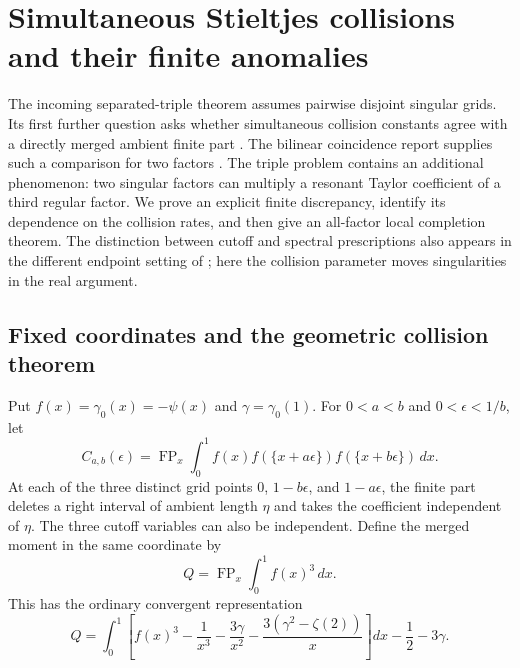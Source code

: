 \section{Simultaneous Stieltjes collisions and their finite anomalies}
\label{cl:sec}

The incoming separated-triple theorem assumes pairwise disjoint singular
grids. Its first further question asks whether simultaneous collision
constants agree with a directly merged ambient finite part
\cite[Question~1]{RepoExact}. The bilinear coincidence report supplies
such a comparison for two factors \cite{RepoCoincident}. The triple
problem contains an additional phenomenon: two singular factors can
multiply a resonant Taylor coefficient of a third regular factor.
We prove an explicit finite discrepancy, identify its dependence on the
collision rates, and then give an all-factor local completion theorem.
The distinction between cutoff and spectral prescriptions also appears
in the different endpoint setting of \cite{RepoEndpoint}; here the
collision parameter moves singularities in the real argument.

\subsection{Fixed coordinates and the geometric collision theorem}
\label{cl:geometric}

Put $f(x)=\gamma_0(x)=-\psi(x)$ and $\gamma=\gamma_0(1)$. For
$0<a<b$ and $0<\epsilon<1/b$, let
\[
 C_{a,b}(\epsilon)=\operatorname{FP}_x\int_0^1
 f(x)f(\{x+a\epsilon\})f(\{x+b\epsilon\})\,dx.
\]
At each of the three distinct grid points $0$, $1-b\epsilon$, and
$1-a\epsilon$, the finite part deletes a right interval of ambient
length $\eta$ and takes the coefficient independent of $\eta$.
The three cutoff variables can also be independent. Define the merged
moment in the same coordinate by
\begin{equation}\label{cl:merged}
 Q=\operatorname{FP}_x\int_0^1f(x)^3\,dx.
\end{equation}
This has the ordinary convergent representation
\begin{equation}\label{cl:merged-convergent}
 Q=\int_0^1\left[f(x)^3-\frac1{x^3}-\frac{3\gamma}{x^2}
       -\frac{3(\gamma^2-\zeta(2))}{x}\right]dx-\frac12-3\gamma.
\end{equation}

